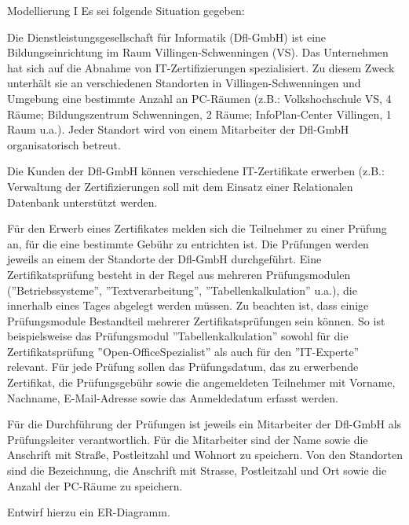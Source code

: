 \documentclass[12pt,a4paper,notitlepage,leqno]{article}
\begin{document}
\vspace{0.2cm}

\begin{paufgabe}{Modellierung I}
Es sei folgende Situation gegeben:\medskip

{\sf Die Dienstleistungsgesellschaft für Informatik (Dfl-GmbH) ist eine Bildungseinrichtung im Raum Villingen-Schwenningen (VS). Das Unternehmen hat sich auf die Abnahme von IT-Zertifizierungen spezialisiert. Zu diesem Zweck unterhält sie an verschiedenen Standorten in Villingen-Schwenningen und Umgebung eine bestimmte Anzahl an PC-Räumen (z.B.: Volkshochschule VS, 4 Räume; Bildungszentrum Schwenningen, 2 Räume; InfoPlan-Center Villingen, 1 Raum u.a.). Jeder Standort wird von einem Mitarbeiter der Dfl-GmbH organisatorisch betreut.

Die Kunden der Dfl-GmbH können verschiedene IT-Zertifikate erwerben (z.B.: Verwaltung der Zertifizierungen soll mit dem Einsatz einer Relationalen Datenbank unterstützt werden.

Für den Erwerb eines Zertifikates melden sich die Teilnehmer zu einer Prüfung an, für die eine bestimmte Gebühr zu entrichten ist. Die Prüfungen werden jeweils an einem der Standorte der Dfl-GmbH durchgeführt. Eine Zertifikatsprüfung besteht in der Regel aus mehreren Prüfungsmodulen (''Betriebssysteme'', ''Textverarbeitung'', ''Tabellenkalkulation'' u.a.), die innerhalb eines Tages abgelegt werden müssen. Zu beachten ist, dass einige Prüfungsmodule Bestandteil mehrerer Zertifikatsprüfungen sein können. So ist beispielsweise das Prüfungsmodul ''Tabellenkalkulation'' sowohl für die Zertifikatsprüfung ''Open-OfficeSpezialist'' als auch für den ''IT-Experte'' relevant.
Für jede Prüfung sollen das Prüfungsdatum, das zu erwerbende Zertifikat, die Prüfungsgebühr sowie die angemeldeten Teilnehmer mit Vorname, Nachname, E-Mail-Adresse sowie das Anmeldedatum erfasst werden.

Für die Durchführung der Prüfungen ist jeweils ein Mitarbeiter der Dfl-GmbH als Prüfungsleiter verantwortlich. Für die Mitarbeiter sind der Name sowie die Anschrift mit Straße, Postleitzahl und Wohnort zu speichern.
Von den Standorten sind die Bezeichnung, die Anschrift mit Strasse, Postleitzahl und Ort sowie die Anzahl der PC-Räume zu speichern.}\medskip

Entwirf hierzu ein ER-Diagramm.

\end{paufgabe}
\end{document}

